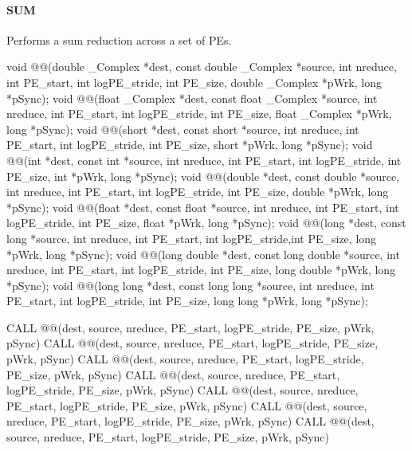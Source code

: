 \begin{apidefinition}
\paragraph{SUM}
Performs a sum reduction across a set of \acp{PE}.\newline
\begin{Csynopsis}
void @@(double _Complex *dest, const double _Complex *source, int nreduce, int PE_start, int logPE_stride, int PE_size, double _Complex *pWrk, long *pSync);
void @@(float _Complex *dest, const float _Complex *source, int nreduce, int PE_start, int logPE_stride, int PE_size, float _Complex *pWrk, long *pSync);
void @@(short *dest, const short *source, int nreduce, int PE_start, int logPE_stride, int PE_size, short *pWrk, long *pSync);
void @@(int *dest, const int *source, int nreduce, int PE_start, int logPE_stride, int PE_size, int *pWrk, long *pSync);
void @@(double *dest, const double *source, int nreduce, int PE_start, int logPE_stride, int PE_size, double *pWrk, long *pSync);
void @@(float *dest, const float *source, int nreduce, int PE_start, int logPE_stride, int PE_size, float *pWrk, long *pSync);
void @@(long *dest, const long *source, int nreduce, int PE_start, int logPE_stride,int PE_size, long *pWrk, long *pSync);
void @@(long double *dest, const long double *source, int nreduce, int PE_start, int logPE_stride, int PE_size, long double *pWrk, long *pSync);
void @@(long long *dest, const long long *source, int nreduce, int PE_start, int logPE_stride, int PE_size, long long *pWrk, long *pSync);
\end{Csynopsis}

\begin{Fsynopsis}
CALL @@(dest, source, nreduce, PE_start, logPE_stride, PE_size, pWrk, pSync)
CALL @@(dest, source, nreduce, PE_start, logPE_stride, PE_size, pWrk, pSync)
CALL @@(dest, source, nreduce, PE_start, logPE_stride, PE_size, pWrk, pSync)
CALL @@(dest, source, nreduce, PE_start, logPE_stride, PE_size, pWrk, pSync)
CALL @@(dest, source, nreduce, PE_start, logPE_stride, PE_size, pWrk, pSync)
CALL @@(dest, source, nreduce, PE_start, logPE_stride, PE_size, pWrk, pSync)
CALL @@(dest, source, nreduce, PE_start, logPE_stride, PE_size, pWrk, pSync)
\end{Fsynopsis}


\end{apidefinition}
